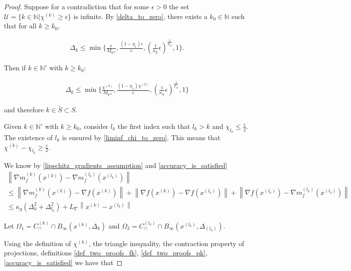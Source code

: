 \documentclass{article}
\theoremstyle{case}
\newcommand{\lipgrad}{{L_{\nabla}}}
\newcommand{\maxhessian}{{M_{\nabla^2}}}
\newcommand{\xk}{{x^{(k)}}}
\newcommand{\naturals}{\mathbb N}
\newcommand{\dk}{\Delta_k}
\newcommand{\chik}{{\chi^{(k)}}}
\newcommand{\gk}{{\nabla m_f^{(k)}(x^{(k)})}}
\newcommand{\gradf}{\nabla f}
\newcommand{\capcones}{{C^{(k)}_{\cap}}}
\newcommand{\tr}{{ B_{\infty}\left(\xk, \dk\right) }}
\begin{document}
\begin{proof}
Suppose for a contradiction that for some $\epsilon > 0$ the set $\mathcal U = \{k \in \naturals | \chik \ge \epsilon \}$ is infinite.
By \cref{delta_to_zero}, there exists a $k_0 \in \naturals$ such that for all $k \ge k_0$,

\begin{align*}
\dk \le \min\{\frac{\epsilon}{\maxhessian}, \frac{(1-\eta_1)\epsilon}{c}, \left(\frac 1 {\kappa_{\chi}}  \epsilon \right)^{\frac 1 {p_{\Delta}}}, 1\}.
\end{align*}

Then if $k \in \naturals '$ with $k \ge k_0$:

\begin{align*}
\dk \le \min\{\frac{\chik}{\maxhessian}, \frac{(1-\eta_1)\chik}{c}, \left(\frac 1 {\kappa_{\chi}}  \epsilon \right)^{\frac 1 {p_{\Delta}}}, 1\}
\end{align*}

and therefore $k \in \bar S \subset S$.

Given $k \in \naturals'$ with $k\ge k_0$, consider $l_k$ the first index such that $l_k > k$ and $\chi_{l_k} \le \frac{\epsilon} 2$.
The existence of $l_k$ is ensured by \cref{liminf_chi_to_zero}.
This means that $\chik - \chi_{l_k} \ge \frac {\epsilon} 2 $.

We know by \cref{lipschitz_gradients_assumption} and \cref{accuracy_is_satisfied}
\begin{align*}
\left\|\gk - {\nabla m_f^{(l_k)}\left(x^{(l_k)}\right)}\right\| \\
\le \left\|\gk - \gradf(\xk)\right\| + \left\|\gradf(\xk) - \gradf(x^{(l_k)})\right\| + \left\|\gradf(x^{(l_k)}) - {\nabla m_f^{(l_k)}\left(x^{(l_k)}\right)}\right\| \\
\le \kappa_g \left(\dk^2 + \Delta_{l_k}^2\right) + \lipgrad \left\|\xk - x^{(l_k)} \right\| \label{chi2zero2_comp1}
\end{align*}

Let $\Omega_1 = \capcones \cap \tr$ and $\Omega_2 = {C^{(l_k)}_{\cap}} \cap B_{\infty}\left(x^{(l_k)}, \Delta_{(l_k)}\right) $.










Using the definition of $\chik$, the triangle inequality, the contraction property of projections,
definitions \cref{def_two_proofs_fk}, \cref{def_two_proofs_pk}, \cref{accuracy_is_satisfied} we have that


\end{proof}
\end{document}

